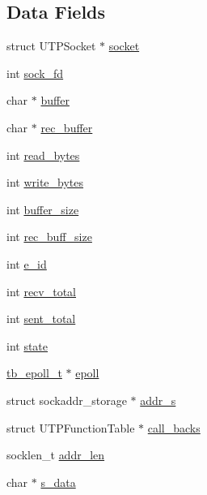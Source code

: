 \subsection*{Data Fields}
\begin{DoxyCompactItemize}
\item 
struct U\-T\-P\-Socket $\ast$ \hyperlink{structtb__utp__t_add15e39a83c7a0c72140c305bdd386d0}{socket}
\item 
int \hyperlink{structtb__utp__t_a514331e6141a28289f8ddead55eadebd}{sock\-\_\-fd}
\item 
char $\ast$ \hyperlink{structtb__utp__t_aff2566f4c366b48d73479bef43ee4d2e}{buffer}
\item 
char $\ast$ \hyperlink{structtb__utp__t_a2e6fac18f9532108c2aa44a52d3c6d67}{rec\-\_\-buffer}
\item 
int \hyperlink{structtb__utp__t_aeb56438a9cac1febce2dcddd6c404759}{read\-\_\-bytes}
\item 
int \hyperlink{structtb__utp__t_a814ec097a6a396e10f9f0924e924684e}{write\-\_\-bytes}
\item 
int \hyperlink{structtb__utp__t_af22ff4ab7a026e6c3b4b08eafb2df027}{buffer\-\_\-size}
\item 
int \hyperlink{structtb__utp__t_a57c1edf513c216e498e37e3428180480}{rec\-\_\-buff\-\_\-size}
\item 
int \hyperlink{structtb__utp__t_ae2ab59af76be940892170990721a0832}{e\-\_\-id}
\item 
int \hyperlink{structtb__utp__t_abf192d5591e28d37f0795a6c730a9a5b}{recv\-\_\-total}
\item 
int \hyperlink{structtb__utp__t_a8cb5bfce3dd82afd8155aae9c7328441}{sent\-\_\-total}
\item 
int \hyperlink{structtb__utp__t_a89f234133d3efe315836311cbf21c64b}{state}
\item 
\hyperlink{structtb__epoll__t}{tb\-\_\-epoll\-\_\-t} $\ast$ \hyperlink{structtb__utp__t_af7fbbda1b15f6051fb8cead0ada5ce7e}{epoll}
\item 
struct sockaddr\-\_\-storage $\ast$ \hyperlink{structtb__utp__t_a6c6b934648a67540d62892076f229e35}{addr\-\_\-s}
\item 
struct U\-T\-P\-Function\-Table $\ast$ \hyperlink{structtb__utp__t_af8b7b669057336d848a5117e4232a83a}{call\-\_\-backs}
\item 
socklen\-\_\-t \hyperlink{structtb__utp__t_a116941d922ae354d7241d04b0f3c84d8}{addr\-\_\-len}
\item 
char $\ast$ \hyperlink{structtb__utp__t_acf38f384acf7d5603daf8ddcd2a71a25}{s\-\_\-data}

\end{DoxyCompactItemize}
